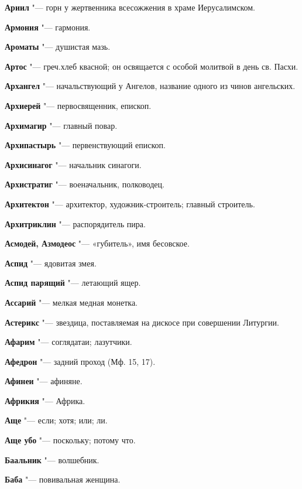 \begin{mymulticols}
\noindent\textbf{Ариил} "--- горн у жертвенника всесожжения в храме Иерусалимском. 

\noindent\textbf{Армония} "--- гармония. 

\noindent\textbf{Ароматы} "--- душистая мазь. 

\noindent\textbf{Артос} "--- греч.хлеб квасной; он освящается с особой молитвой в день св. Пасхи. 

\noindent\textbf{Архангел} "--- начальствующий у Ангелов, название одного из чинов ангельских. 

\noindent\textbf{Архиерей} "--- первосвященник, епископ. 

\noindent\textbf{Архимагир} "--- главный повар. 

\noindent\textbf{Архипастырь} "--- первенствующий епископ. 

\noindent\textbf{Архисинагог} "--- начальник синагоги. 

\noindent\textbf{Архистратиг} "--- военачальник, полководец. 

\noindent\textbf{Архитектон} "--- архитектор, художник-строитель; главный строитель. 

\noindent\textbf{Архитриклин} "--- распорядитель пира. 

\noindent\textbf{Асмодей, Азмодеос} "--- «губитель», имя бесовское. 

\noindent\textbf{Аспид} "--- ядовитая змея. 

\noindent\textbf{Аспид парящий} "--- летающий ящер. 

\noindent\textbf{Ассарий} "--- мелкая медная монетка. 

\noindent\textbf{Астерикс} "--- звездица, поставляемая на дискосе при совершении Литургии. 

\noindent\textbf{Афарим} "--- соглядатаи; лазутчики. 

\noindent\textbf{Афедрон} "--- задний проход (Мф. 15, 17). 

\noindent\textbf{Афинеи} "--- афиняне. 

\noindent\textbf{Африкия} "--- Африка. 

\noindent\textbf{Аще} "--- если; хотя; или; ли. 

\noindent\textbf{Аще убо} "--- поскольку; потому что. 

\bukvaending


\noindent\textbf{Баальник} "--- волшебник. 

\noindent\textbf{Баба} "--- повивальная женщина. 


\end{mymulticols}
